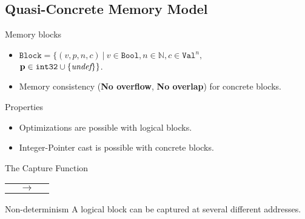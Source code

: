 \subsection{Quasi-Concrete Memory Model}
\begin{frame}{\subsecname}

  \begin{block}{Memory blocks}
    \begin{itemize}
    \item $\texttt{Block}=\{(v,p,n,c)~|~v\in\texttt{Bool},n\in\mathbb{N},c\in\texttt{Val}^{n},$\\
      $\mathbf{p\in\texttt{int32}\cup\{\textit{undef}\}}\}$.
    \item Memory consistency (\textbf{No overflow}, \textbf{No overlap}) for concrete blocks.
    \end{itemize}
  \end{block}
  \vfill
  \begin{exampleblock}{Properties}
    \begin{itemize}
    \item Optimizations are possible with logical blocks.
    \item Integer-Pointer cast is possible with concrete blocks.
    \end{itemize}
  \end{exampleblock}
  
\end{frame}

\begin{frame}{The Capture Function}

  \begin{tabular}{l c r}
     & $\longrightarrow$ &
    
  \end{tabular}
  \vfill
  \begin{alertblock}{Non-determinism}
    A logical block can be captured at several different addresses.
  \end{alertblock}
  
\end{frame}

%    
%    
%
